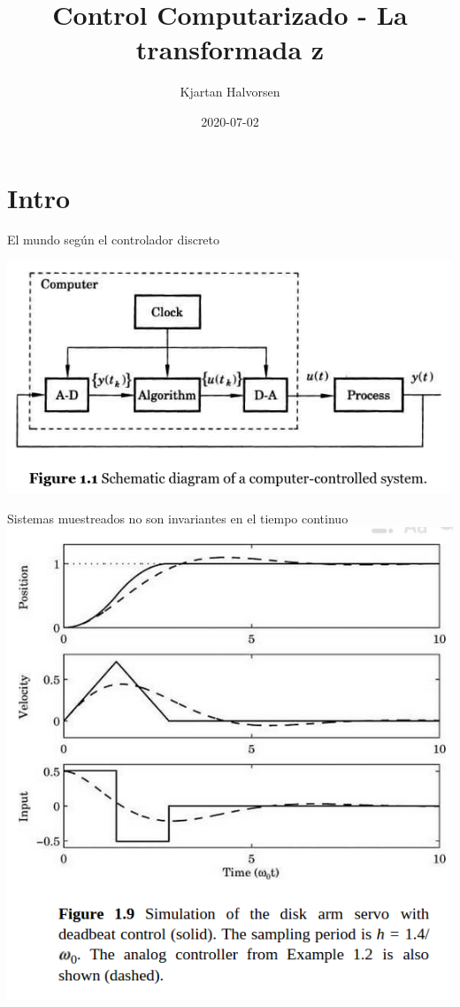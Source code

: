 \documentclass[presentation,aspectratio=169]{beamer}
\author{Kjartan Halvorsen}
\date{2020-07-02}
\title{Control Computarizado - La transformada z}
\begin{document}
\maketitle

\section{Intro}
\label{sec:orgaa52c3a}
\begin{frame}[label={sec:org8ede222}]{El mundo según el controlador discreto}
\begin{center}
\includegraphics[width=0.6\linewidth]{../../figures/fig1-1-schematic.png}
\end{center}
\end{frame}
\begin{frame}[label={sec:orgf1b2e9c}]{Sistemas muestreados \alert{no} son invariantes en el tiempo continuo}
\includegraphics[height=0.6\linewidth]{../../figures/fig1-9.png}
\end{frame}
\end{document}
